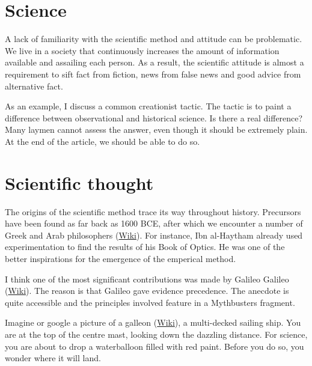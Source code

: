 \begin{multicols}{2}
\section{Science}
A lack of familiarity with the scientific method and attitude can be problematic. We live in a society that continuously increases the amount of information available and assailing each person. As a result, the scientific attitude is almost a requirement to sift fact from fiction, news from false news and good advice from alternative fact. 

As an example, I discuss a common creationist tactic. The tactic is to paint a difference between observational and historical science. Is there a real difference? Many laymen cannot assess the answer, even though it should be extremely plain. At the end of the article, we should be able to do so.

\section{Scientific thought}

The origins of the scientific method trace its way throughout history. Precursors have been found as far back as 1600 BCE, after which we encounter a number of Greek and Arab philosophers (\href{http://en.wikipedia.org/wiki/List_of_ancient_Greek_philosophers}{Wiki}). For instance, Ibn al-Haytham already used experimentation to find the results of his Book of Optics. He was one of the better inspirations for the emergence of the emperical method.

I think one of the most significant contributions was made by Galileo Galileo (\href{https://en.wikipedia.org/wiki/Galileo_Galilei}{Wiki}). The reason is that Galileo gave evidence precedence. The anecdote is quite accessible and the principles involved feature in a Mythbusters fragment.  

Imagine or google a picture of a galleon (\href{https://en.wikipedia.org/wiki/Galleon}{Wiki}), a multi-decked sailing ship. You are at the top of the centre mast, looking down the dazzling distance. For science, you are about to drop a waterballoon filled with red paint. Before you do so, you wonder where it will land.


\end{multicols}
